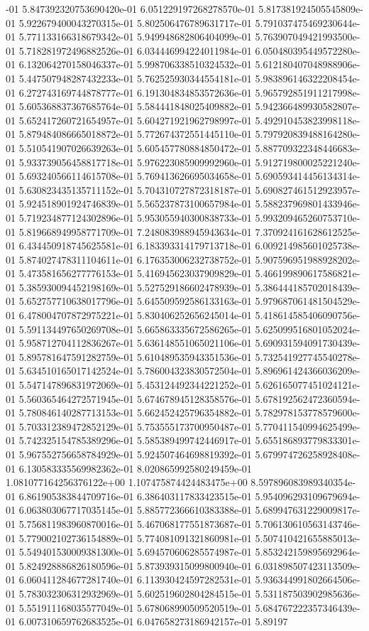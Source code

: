 -01	5.847392320753690420e-01	6.051229197268278570e-01	5.817381924505545809e-01	5.922679400043270315e-01	5.802506476789631717e-01	5.791037475469230644e-01	5.771133166318679342e-01	5.949948682806404099e-01	5.763907049421993500e-01	5.718281972496882526e-01	6.034446994224011984e-01	6.050480395449572280e-01	6.132064270158046337e-01	5.998706338510324532e-01	5.612180407048988906e-01	5.447507948287432233e-01	5.762525930344554181e-01	5.983896146322208454e-01	6.272743169744878777e-01	6.191304834853572636e-01	5.965792851911217998e-01	5.605368837367685764e-01	5.584441848025409882e-01	5.942366489930582807e-01	5.652417260721654957e-01	5.604271921962798997e-01	5.492910453823998118e-01	5.879484086665018872e-01	5.772674372551445110e-01	5.797920839488164280e-01	5.510541907026639263e-01	5.605457780884850472e-01	5.887709322348446683e-01	5.933739056458817718e-01	5.976223085909992960e-01	5.912719800025221240e-01	5.693240566114615708e-01	5.769413626695034658e-01	5.690593414456134314e-01	5.630823435135711152e-01	5.704310727872318187e-01	5.690827461512923957e-01	5.924518901924746839e-01	5.565237873100657984e-01	5.588237969801433946e-01	5.719234877124302896e-01	5.953055940300838733e-01	5.993209465260753710e-01	5.819668949958771709e-01	7.248083988945943634e-01	7.370924161628612525e-01	6.434450918745625581e-01	6.183393314179713718e-01	6.009214985601025738e-01	5.874027478311104611e-01	6.176353006232738752e-01	5.907596951988928202e-01	5.473581656277776153e-01	5.416945623037909829e-01	5.466199890617586821e-01	5.385930094452198169e-01	5.527529186602478939e-01	5.386444185702018439e-01	5.652757710638017796e-01	5.645509592586133163e-01	5.979687061481504529e-01	6.478004707872975221e-01	5.830406252656245014e-01	5.418614585406090756e-01	5.591134497650269708e-01	5.665863335672586265e-01	5.625099516801052024e-01	5.958712704112836267e-01	5.636148551065021106e-01	5.690931594091730439e-01	5.895781647591282759e-01	5.610489535943351536e-01	5.732541927745540278e-01	5.634510165017142524e-01	5.786004323830572504e-01	5.896961424366036209e-01	5.547147896831972069e-01	5.453124492344221252e-01	5.626165077451024121e-01	5.560365464272571945e-01	5.674678945128358576e-01	5.678192562472360594e-01	5.780846140287713153e-01	5.662452425796354882e-01	5.782978153778579600e-01	5.703312389472852129e-01	5.753555173700950487e-01	5.770411540994625499e-01	5.742325154785389296e-01	5.585389499742446917e-01	5.655186893779833301e-01	5.967552756658784929e-01	5.924507464698819392e-01	5.679974726258928408e-01	6.130583335569982362e-01	8.020865992580249459e-01	1.081077164256376122e+00	1.107475874424483475e+00	8.597896083989340354e-01	6.861905383844709716e-01	6.386403117833423515e-01	5.954096293109679694e-01	6.063803067717035145e-01	5.885772366610383388e-01	5.689947631229009817e-01	5.756811983960870016e-01	5.467068177551873687e-01	5.706130610563143746e-01	5.779002102736154889e-01	5.774081091321860981e-01	5.507410421655885013e-01	5.549401530009381300e-01	5.694570606285574987e-01	5.853242159895692964e-01	5.824928886826180596e-01	5.873939315099800940e-01	6.031898507423113509e-01	6.060411284677281740e-01	6.113930424597282531e-01	5.936344991802664506e-01	5.783032306312932969e-01	5.602519602804284515e-01	5.531187503902985636e-01	5.551911168035577049e-01	5.678068990509520519e-01	5.684767222357346439e-01	6.007310659762683525e-01	6.047658273186942157e-01	5.89197